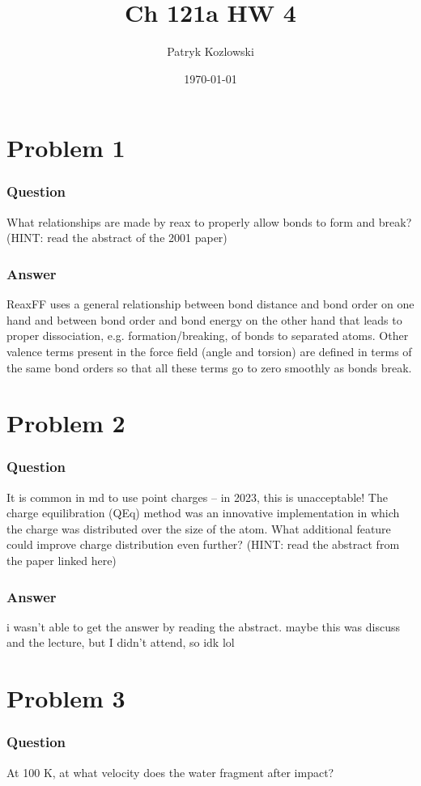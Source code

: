 \documentclass[12pt]{article}
\title{Ch 121a HW 4}
\author{Patryk Kozlowski}
\date{\today}
\begin{document}
\maketitle
\section{Problem 1}
\subsubsection{Question}
 What relationships are made by reax to properly allow bonds to form and break? (HINT: read the abstract of the 2001 paper)
\subsubsection{Answer}
ReaxFF uses a general relationship between bond distance and bond order on one hand and between bond order and bond energy on the other hand that leads to proper dissociation, e.g. formation/breaking, of bonds to separated atoms. Other valence terms present in the force field (angle and torsion) are defined in terms of the same bond orders so that all these terms go to zero smoothly as bonds break.
\section{Problem 2}
\subsubsection{Question}
It is common in md to use point charges – in 2023, this is unacceptable! The charge equilibration (QEq) method was an innovative implementation in which the charge was distributed over the size of the atom. What additional feature could improve charge distribution even further? (HINT: read the abstract from the paper linked here)
\subsubsection{Answer}
i wasn't able to get the answer by reading the abstract. maybe this was discuss and the lecture, but I didn't attend, so idk lol
\section{Problem 3}
\subsubsection{Question}
At 100 K, at what velocity does the water fragment after impact?
\end{document}
